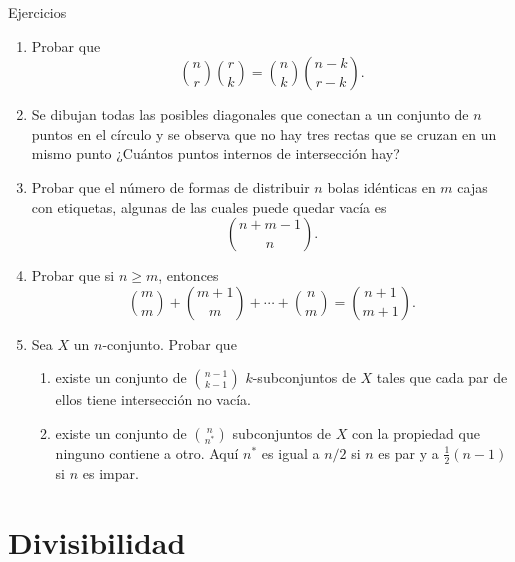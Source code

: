 \begin{section}{Ejercicios}
\begin{enumerate}
\item Probar que
$$
\binom{n}{r}\binom{r}{k}=\binom{n}{k}\binom{n-k}{r-k}.
$$

\item Se dibujan todas las posibles diagonales que conectan a un conjunto de $n$
puntos en el círculo y se observa que no hay tres rectas que se cruzan en un
mismo punto ¿Cuántos puntos internos de intersección hay?

\item Probar que el número de formas de distribuir $n$ bolas idénticas en $m$
cajas con etiquetas, algunas de las cuales puede quedar vacía es
$$
\binom{n+m-1}{n}.
$$

\item Probar que si $n \ge m$, entonces
$$
\binom{m}{m}+\binom{m+1}{m}+\cdots+\binom{n}{m}=\binom{n+1}{m+1}.
$$

\item  Sea $X$ un $n$-conjunto. Probar que

\begin{enumerate}
    \item existe un conjunto de $\binom{n-1}{k-1}$ $k$-subconjuntos de
$X$ tales que cada par de ellos tiene intersección no vacía.

    \item existe un conjunto de $\binom{n}{n^*}$ subconjuntos de $X$ 
con la propiedad que ninguno contiene a otro. Aquí $n^*$ es igual
a $n/2$ si $n$ es par y a $\frac12(n-1)$ si $n$ es impar.
\end{enumerate}
\end{enumerate}

\end{section}


\chapter[Divisibilidad]{Divisibilidad}\label{cap.divisibilidad}

